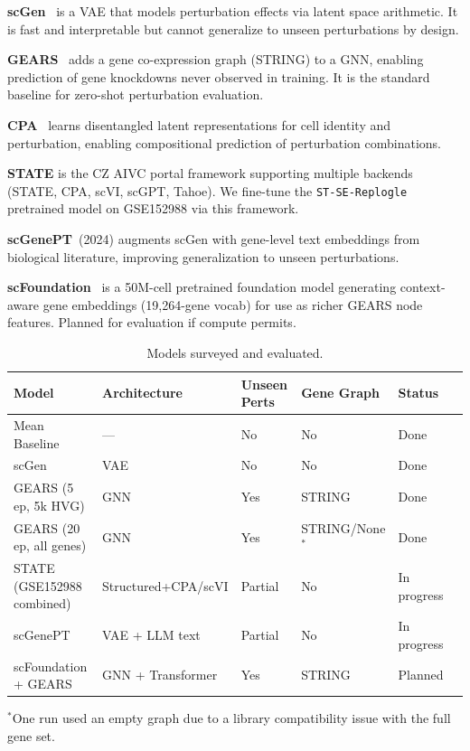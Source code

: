 \documentclass[11pt,letterpaper]{article}
\begin{document}
\textbf{scGen}~\cite{lopez2018} is a VAE that models perturbation effects via latent space
arithmetic. It is fast and interpretable but cannot generalize to unseen perturbations by design.

\textbf{GEARS}~\cite{roohani2023} adds a gene co-expression graph (STRING) to a GNN, enabling
prediction of gene knockdowns never observed in training. It is the standard baseline for
zero-shot perturbation evaluation.

\textbf{CPA}~\cite{lotfollahi2021} learns disentangled latent representations for cell identity
and perturbation, enabling compositional prediction of perturbation combinations.

\textbf{STATE} is the CZ AIVC portal framework supporting multiple backends (STATE, CPA, scVI,
scGPT, Tahoe). We fine-tune the \texttt{ST-SE-Replogle} pretrained model on GSE152988 via this
framework.

\textbf{scGenePT}~(2024) augments scGen with gene-level text embeddings from biological
literature, improving generalization to unseen perturbations.

\textbf{scFoundation}~\cite{hao2024} is a 50M-cell pretrained foundation model generating
context-aware gene embeddings (19,264-gene vocab) for use as richer GEARS node features.
Planned for evaluation if compute permits.

\begin{table}[h]
\centering
\caption{Models surveyed and evaluated.}
\small
\begin{tabular}{llllll}
\toprule
Model & Architecture & Unseen Perts & Gene Graph & Status \\
\midrule
Mean Baseline        & ---                  & No      & No      & Done \\
scGen                & VAE                  & No      & No      & Done \\
GEARS (5 ep, 5k HVG) & GNN                 & Yes     & STRING  & Done \\
GEARS (20 ep, all genes) & GNN             & Yes     & STRING/None$^*$ & Done \\
STATE (GSE152988 combined) & Structured+CPA/scVI & Partial & No & In progress \\
scGenePT             & VAE + LLM text       & Partial & No      & In progress \\
scFoundation + GEARS & GNN + Transformer    & Yes     & STRING  & Planned \\
\bottomrule
\end{tabular}
\vspace{2pt}
{\footnotesize $^*$One run used an empty graph due to a library compatibility issue with the full gene set.}
\end{table}
\end{document}
